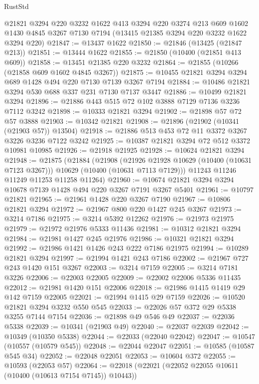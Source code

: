 \begin{lexlean}{RustStd}
\begin{coremodule}
    @21821
    @3294
    @220
    @3232
    @1622
    @413
    @3294
    @220
    @3274
    @213
    @609
    @1602
    @1430
    @4845
    @3267
    @7130
    @7194
    (@13415 @21385 @3294 @220 @3232 @1622 @3294 @220)
@21847 := @13437 @1622
@21850 := @21846 (@13425 (@21847 @213))
@21851 := @13444 @1622
@21855 := @21850 (@10400 (@21851 @413 @609))
@21858 := @13451 @21385 @220 @3232
@21864 := @21855 (@10266 (@21858 @609 @1602 @4845 @3267))
@21875 := @10455 @21821 @3294 @3294 @689 @1428 @494 @220 @7130 @7139 @3267 @7194
@21884 := @10486 @21821 @3294 @530 @688 @337 @231 @7130 @7137 @3447
@21886 := @10499 @21821 @3294
@21896 := @21886 @443 @515 @72 @102 @3888 @7129 @7136 @3236 @7112 @3242
@21898 := @10333 @21821 @3294
@21902 := @21898 @57 @72 @57 @3888
@21903 := @10342 @21821
@21908 := @21896 (@21902 (@10341 (@21903 @57)) @13504)
@21918 := @21886 @513 @453 @72 @11 @3372 @3267 @3226 @3236 @7122 @3242
@21925 := @10387 @21821 @3294 @72 @512 @3372 @10981 @10985
@21926 := @21918 @21925
@21928 := @10624 @21821 @3294
@21948 := @21875
    (@21884
      (@21908
        (@21926 @21928 @10629 (@10400 (@10631 @7123 @3267)))
        @10629
        (@10400 (@10631 @7113 @7129)))
      @11243
      @11246
      @11249
      @11253
      @11258
      @11264)
@21960 := @10674 @21821 @3294 @3294 @10678 @7139 @1428 @494 @220 @3267 @7191 @3267 @5401
@21961 := @10797 @21821
@21965 := @21961 @1428 @220 @3267 @7190
@21967 := @10806 @21821 @3294
@21972 := @21967 @800 @220 @1427 @245 @3267
@21973 := @3214 @7186
@21975 := @3214 @5392 @12262
@21976 := @21973 @21975
@21979 := @21972 @21976 @5333 @11436
@21981 := @10312 @21821 @3294
@21984 := @21981 @1427 @245 @21976
@21986 := @10321 @21821 @3294
@21992 := @21986 @1421 @1426 @243 @222 @7186 @21975
@21994 := @10289 @21821 @3294
@21997 := @21994 @1421 @243 @7186
@22002 := @21967 @727 @243 @1420 @151 @3267
@22003 := @3214 @7159
@22005 := @3214 @7181 @3226
@22006 := @22003 @22005
@22009 := @22002 @22006 @5336 @11435
@22012 := @21981 @1420 @151 @22006
@22018 := @21986 @1415 @1419 @29 @142 @7159 @22005
@22021 := @21994 @1415 @29 @7159
@22026 := @10520 @21821 @3294 @3232 @550 @545
@22033 := @22026 @57 @372 @29 @5338 @3255 @7144 @7154
@22036 := @21898 @49 @546 @49
@22037 := @22036 @5338
@22039 := @10341 (@21903 @49)
@22040 := @22037 @22039
@22042 := @10349 (@10350 @5338)
@22044 := @22033 (@22040 @22042)
@22047 := @10547 (@10557 (@10579 @545))
@22048 := @22044 @22047
@22051 := @10585 (@10587 @545 @34)
@22052 := @22048 @22051
@22053 := @10604 @372
@22055 := @10593 (@22053 @57)
@22064 := @22018 (@22021 (@22052 @22055 @10611 (@10400 (@10613 @7154 @7145)) @10443))

\end{coremodule}
\end{lexlean}
